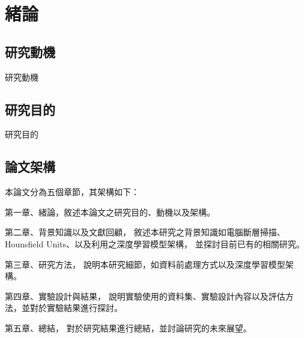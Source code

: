 \documentclass[class=NCU_thesis, crop=false]{standalone}
\begin{document}
\chapter{緒論}
\section{研究動機}

研究動機

\section{研究目的}

研究目的

\section{論文架構}
本論文分為五個章節，其架構如下：

第一章、緒論，敘述本論文之研究目的、動機以及架構。

第二章、背景知識以及文獻回顧，
敘述本研究之背景知識如電腦斷層掃描、Hounsfield Units、以及利用之深度學習模型架構，
並探討目前已有的相關研究。

第三章、研究方法，
說明本研究細節，如資料前處理方式以及深度學習模型架構。

第四章、實驗設計與結果，
說明實驗使用的資料集、實驗設計內容以及評估方法，並對於實驗結果進行探討。

第五章、總結，
對於研究結果進行總結，並討論研究的未來展望。
\end{document}
